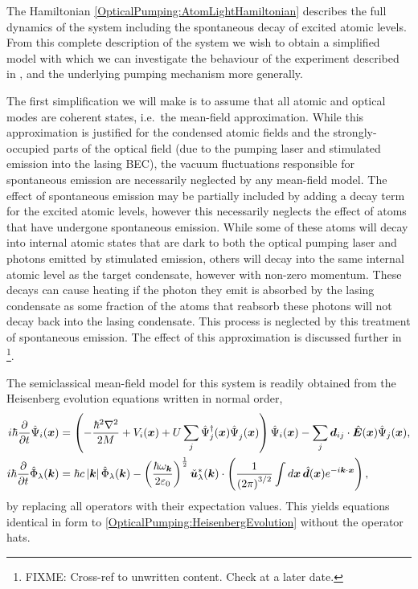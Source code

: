 The Hamiltonian \eqref{OpticalPumping:AtomLightHamiltonian} describes the full dynamics of the system including the spontaneous decay of excited atomic levels.  From this complete description of the system we wish to obtain a simplified model with which we can investigate the behaviour of the experiment described in , and the underlying pumping mechanism more generally.  

The first simplification we will make is to assume that all atomic and optical modes are coherent states, i.e.\  the mean-field approximation.  While this approximation is justified for the condensed atomic fields and the strongly-occupied parts of the optical field (due to the pumping laser and stimulated emission into the lasing BEC), the vacuum fluctuations responsible for spontaneous emission are necessarily neglected by any mean-field model.  The effect of spontaneous emission may be partially included by adding a decay term for the excited atomic levels, however this necessarily neglects the effect of atoms that have undergone spontaneous emission.  While some of these atoms will decay into internal atomic states that are dark to both the optical pumping laser and photons emitted by stimulated emission, others will decay into the same internal atomic level as the target condensate, however with non-zero momentum.  These decays can cause heating if the photon they emit is absorbed by the lasing condensate as some fraction of the atoms that reabsorb these photons will not decay back into the lasing condensate. This process is neglected by this treatment of spontaneous emission.  The effect of this approximation is discussed further in \footnote{FIXME: Cross-ref to unwritten content. Check at a later date.}.

The semiclassical mean-field model for this system is readily obtained from the Heisenberg evolution equations written in normal order,
\begin{subequations}
    \label{OpticalPumping:HeisenbergEvolution}
    \begin{align}
        i \hbar \frac{\partial}{\partial t} \hat{\Psi}_i(\vect{x}) &= \left(- \frac{\hbar^2 \nabla^2}{2 M} + V_i(\vect{x}) + U\sum_j\hat{\Psi}_j^\dagger(\vect{x})\hat{\Psi}_j^{\phantom{\dagger}}(\vect{x})\right)\hat{\Psi}_i(\vect{x}) - \sum_{j} \vect{d}_{ij} \cdot \hat{\vect{E}}(\vect{x}) \hat{\Psi}_j(\vect{x}),\\
        i \hbar \frac{\partial}{\partial t} \hat{\Phi}_\lambda(\vect{k}) &= \hbar c \abs{\vect{k}} \hat{\Phi}_\lambda(\vect{k}) - \left(\frac{\hbar \omega_{\vect{k}}}{2 \varepsilon_0}\right)^{\frac{1}{2}} \unitvec{u}_\lambda^*(\vect{k}) \cdot \left( \frac{1}{\left(2\pi\right)^{3/2}} \int d \vect{x}\, \hat{\vect{d}}(\vect{x}) e^{-i \vect{k} \cdot \vect{x}} \right),
    \end{align}
\end{subequations}
by replacing all operators with their expectation values.  This yields equations identical in form to \eqref{OpticalPumping:HeisenbergEvolution} without the operator hats.

